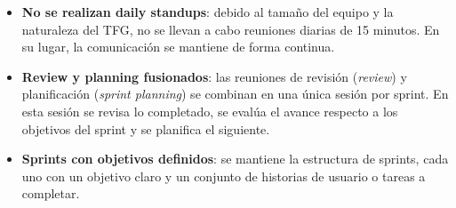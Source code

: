 \begin{itemize}
    \item \textbf{No se realizan daily standups}: debido al tamaño del equipo y la naturaleza del TFG, no se llevan a cabo reuniones diarias de 15 minutos. En su lugar, la comunicación se mantiene de forma continua.
    
    \item \textbf{Review y planning fusionados}: las reuniones de revisión (\textit{review}) y planificación (\textit{sprint planning}) se combinan en una única sesión por sprint. En esta sesión se revisa lo completado, se evalúa el avance respecto a los objetivos del sprint y se planifica el siguiente.

    \item \textbf{Sprints con objetivos definidos}: se mantiene la estructura de sprints, cada uno con un objetivo claro y un conjunto de historias de usuario o tareas a completar.
\end{itemize}